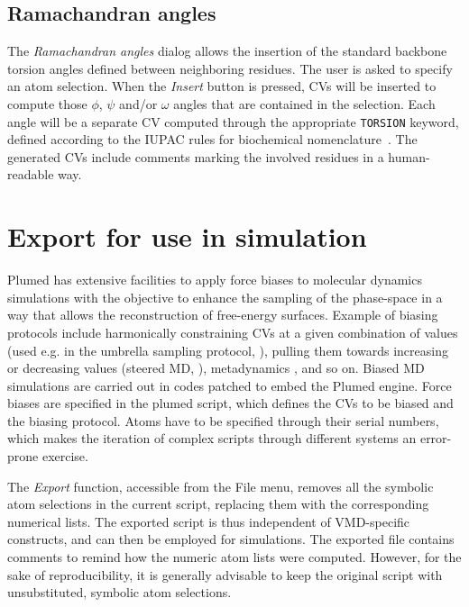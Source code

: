 \documentclass[preprint,12pt]{elsarticle}
\begin{document}
\subsection{Ramachandran angles}

The \emph{Ramachandran angles} dialog allows the insertion of the
standard backbone torsion angles defined between neighboring residues.
The user is asked to specify an atom selection. When the \emph{Insert}
button is pressed, CVs will be inserted to compute those $\phi$,
$\psi$ and/or $\omega$ angles that are contained in the
selection. Each angle will be a separate CV computed through the
appropriate \texttt{TORSION} keyword, defined according to the IUPAC
rules for biochemical nomenclature~\cite{IUPAC}. The generated CVs
include comments marking the involved residues in a human-readable
way.








\section{Export for use in simulation}\label{sec:export-use-simul}

Plumed has extensive facilities to apply force biases to molecular
dynamics simulations with the objective to enhance the sampling of the
phase-space in a way that allows the reconstruction of free-energy
surfaces. Example of biasing protocols include harmonically
constraining CVs at a given combination of values (used e.g. in the
umbrella sampling protocol, \cite{Torrie_Valleau_1977}), pulling them
towards increasing or decreasing values (steered MD,
\cite{Isralewitz_Gao_Schulten_2001,Giorgino_2011}), metadynamics
\cite{Laio_Parrinello_2002}, and so on. Biased MD simulations are
carried out in codes patched to embed the Plumed engine. Force biases
are specified in the plumed script, which defines the CVs to be biased
and the biasing protocol.  Atoms have to be specified through their
serial numbers, which makes the iteration of complex scripts through
different systems an error-prone exercise.

The \emph{Export} function, accessible from the File menu, removes all
the symbolic atom selections in the current script, replacing them
with the corresponding numerical lists. The exported script is thus
independent of VMD-specific constructs, and can then be employed for
simulations.  The exported file contains comments to remind how the
numeric atom lists were computed. However, for the sake of
reproducibility, it is generally advisable to keep the original
script with unsubstituted, symbolic atom selections.
\end{document}

